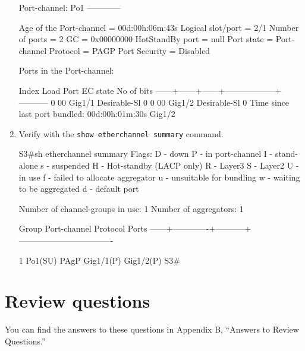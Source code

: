\begin{enumerate}
\begin{cli}
Port-channel: Po1
------------
 
Age of the Port-channel   = 00d:00h:06m:43s
Logical slot/port   = 2/1       Number of ports = 2
GC                  = 0x00000000      HotStandBy port = null
Port state          = Port-channel
Protocol            =   PAGP
Port Security       = Disabled
 
Ports in the Port-channel:
 
Index   Load   Port     EC state        No of bits
------+------+------+------------------+-----------
  0     00     Gig1/1   Desirable-Sl       0
  0     00     Gig1/2   Desirable-Sl       0
Time since last port bundled:    00d:00h:01m:30s    Gig1/2
\end{cli}
\item
  Verify with the \texttt{show\ etherchannel\ summary} command.

\begin{cli}
S3#sh etherchannel summary
Flags:  D - down        P - in port-channel
        I - stand-alone s - suspended
        H - Hot-standby (LACP only)
        R - Layer3      S - Layer2
        U - in use      f - failed to allocate aggregator
        u - unsuitable for bundling
        w - waiting to be aggregated
        d - default port
 
Number of channel-groups in use: 1
Number of aggregators:           1
 
Group  Port-channel  Protocol    Ports
------+-------------+-----------+----------------------------------
 
1      Po1(SU)           PAgP   Gig1/1(P) Gig1/2(P)
S3#
\end{cli}
\end{enumerate}

\section{Review questions}

You can find the answers to these questions in Appendix B, ``Answers to Review Questions.''

